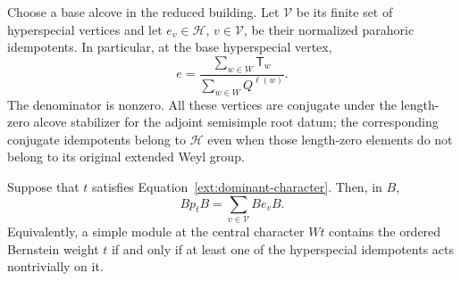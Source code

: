 Choose a base alcove in the reduced building.  Let $\mathcal V$ be its
finite set of hyperspecial vertices and let $e_v\in\mathcal H$,
$v\in\mathcal V$, be their normalized
parahoric idempotents.  In particular, at the base hyperspecial vertex,
\begin{equation}\label{ext:spherical-idempotent}
  e=\frac{\sum_{w\in W}\mathsf T_w}
          {\sum_{w\in W}Q^{\ell(w)}}.
\end{equation}
The denominator is nonzero.  All these vertices are conjugate under the
length-zero alcove stabilizer for the adjoint semisimple root datum;
the corresponding conjugate idempotents belong to $\mathcal H$ even when
those length-zero elements do not belong to its original extended Weyl
group.

\begin{lemma}\label{ext:hecke}
  Suppose that $t$ satisfies Equation~\eqref{ext:dominant-character}.
  Then, in $B$,
  \begin{equation}\label{ext:hecke-ideals}
    Bp_tB=\sum_{v\in\mathcal V}Be_vB.
  \end{equation}
  Equivalently, a simple module at the central character $Wt$ contains the
  ordered Bernstein weight $t$ if and only if at least one of the
  hyperspecial idempotents acts nontrivially on it.
\end{lemma}

